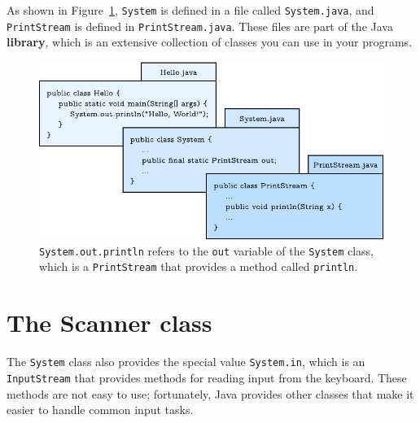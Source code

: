 \documentclass[12pt]{book}
\theoremstyle{exercise}
\newcommand{\java}[1]{\verb"#1"}
\begin{document}

As shown in Figure~\ref{fig.system}, \java{System} is defined in a file called {\tt System.java}, and {\tt PrintStream} is defined in {\tt PrintStream.java}.
These files are part of the Java {\bf library}, which is an extensive collection of classes you can use in your programs.

\begin{figure}[!ht]
\begin{center}
\includegraphics{figs/system.pdf}
\caption{\java{System.out.println} refers to the \java{out} variable of the \java{System} class, which is a \java{PrintStream} that provides a method called \java{println}.}
\label{fig.system}
\end{center}
\end{figure}


\section{The Scanner class}
\label{scanner}

%

The \java{System} class also provides the special value \java{System.in}, which is an \java{InputStream} that provides methods for reading input from the keyboard.
These methods are not easy to use; fortunately, Java provides other classes that make it easier to handle common input tasks.
\end{document}
